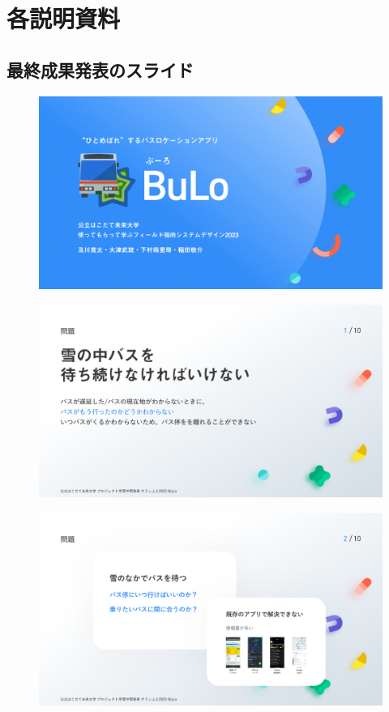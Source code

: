 \chapter{各説明資料}
\section{最終成果発表のスライド}
\begin{figure}[htbp]
    \centering
    \includegraphics[width=14cm]{images/slide0.png}
    \label{fig:slide0}
\end{figure}
\begin{figure}[htbp]
    \includegraphics[width=14cm]{images/slide1.png}
    \label{fig:slide1}
\end{figure}
\begin{figure}[htbp]
    \includegraphics[width=14cm]{images/slide2.png}
    \label{fig:slide2}
\end{figure}
